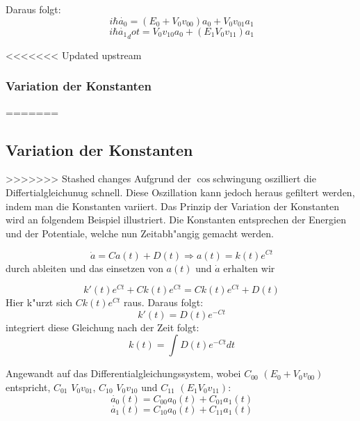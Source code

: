 \begin{refsection}
Daraus folgt:
\[
\ i\hbar\dot{a_{0}} = (E_{0} + V_{0} v_{00}) a_{0} + V_{0} v_{01} a_{1}
\]
\[
\ i\hbar\dot{a_{1}}_dot = V_{0} v_{10} a_{0} + (E_{1} V_{0} v_{11}) a_{1}
\]

<<<<<<< Updated upstream
\subsubsection{Variation der Konstanten}
=======
\subsection{Variation der Konstanten}
>>>>>>> Stashed changes
Aufgrund der $\cos$schwingung oszilliert die Differtialgleichunug schnell. Diese Oszillation kann jedoch heraus gefiltert werden, indem man die Konstanten variiert. Das Prinzip der Variation der Konstanten wird an folgendem Beispiel illustriert. Die Konstanten entsprechen der Energien und der Potentiale, welche nun Zeitabh"angig gemacht werden.

\[
\ \dot{a} = C a(t) + D(t) \Rightarrow a(t) = k(t) e^{C t}
\] 
durch ableiten und das einsetzen von $ a(t)$ und  $ \dot{a} $ erhalten wir

\[
\ k'(t) e^{C t} + C k(t) e^{C t} = C k(t) e^{C t} + D(t)
\] 
Hier k"urzt sich $ C k(t) e^{C t} $ raus.
Daraus folgt:
\[
\ k'(t) = D(t) e^{-C t}
\] 
integriert diese Gleichung nach der Zeit folgt:
\[
\ k(t) = \int D(t) e^{-C t} dt 
\]
 
Angewandt auf das Differentialgleichungssystem, wobei $C_{00}$ $(E_{0} + V_{0} v_{00})$ entspricht, $C_{01}$ $V_{0} v_{01}$, $C_{10}$ $V_{0} v_{10}$ und $C_{11}$ $(E_{1} V_{0} v_{11})$:
\[
\ \dot{a_{0}}(t) = C_{00}a_{0}(t) + C_{01}a_{1}(t)
\]
\[
\ \dot{a_{1}}(t) = C_{10}a_{0}(t) + C_{11}a_{1}(t)
\]


\end{refsection}
